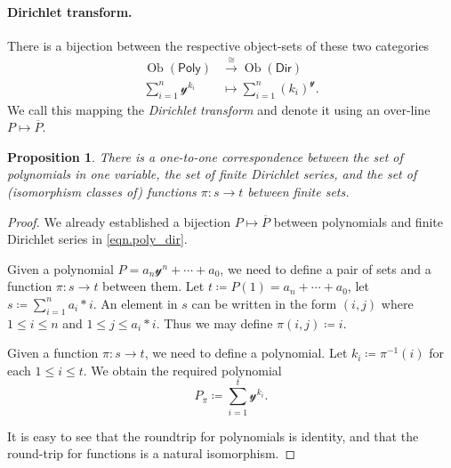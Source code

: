 \documentclass[11pt, article, one side]{memoir}
\theoremstyle{theorem}
\newtheorem{proposition}[equation]{Proposition}
\theoremstyle{definition}
\theoremstyle{remark}
\DeclareMathOperator{\ob}{Ob}
\newcommand{\Cat}[1]{\mathsf{#1}}%
\newcommand{\To}[1]{\xrightarrow{#1}}
\newcommand{\inv}{^{-1}}
\newcommand{\yon}{\mathcal{y}}
\newcommand{\poly}{\Cat{Poly}}
\newcommand{\dir}{\Cat{Dir}}
\begin{document}
\paragraph{Dirichlet transform.}
There is a bijection between the respective object-sets of these two categories
\begin{align}
\nonumber
	\ob(\poly)&\To{\cong}\ob(\dir)\\\label{eqn.poly_dir}
	\sum_{i=1}^n\yon^{k_i}&\mapsto\sum_{i=1}^n (k_i)^\yon.
\end{align}
We call this mapping the \emph{Dirichlet transform} and denote it using an over-line $P\mapsto \overline{P}$.

\begin{proposition}\label{prop.poly_function}
There is a one-to-one correspondence between the set of polynomials in one variable, the set of finite Dirichlet series, and the set of (isomorphism classes of) functions $\pi\colon s\to t$ between finite sets.
\end{proposition}
\begin{proof}
We already established a bijection $P\mapsto\overline{P}$ between polynomials and finite Dirichlet series in \cref{eqn.poly_dir}.

Given a polynomial $P=a_n\yon^n+\cdots+a_0$, we need to define a pair of sets and a function $\pi\colon s\to t$ between them. Let $t\coloneqq P(1)=a_n+\cdots+a_0$, let $s\coloneqq\sum_{i=1}^na_i*i$. An element in $s$ can be written in the form $(i,j)$ where $1\leq i\leq n$ and $1\leq j\leq a_i*i$. Thus we may define $\pi(i,j)\coloneqq i$.

Given a function $\pi\colon s\to t$, we need to define a polynomial. Let $k_i\coloneqq\pi\inv(i)$ for each $1\leq i\leq t$. We obtain the required polynomial
\begin{equation}\label{eqn.Ppi}
	P_\pi\coloneqq\sum_{i=1}^{t}\yon^{k_i}.
\end{equation}

It is easy to see that the roundtrip for polynomials is identity, and that the round-trip for functions is a natural isomorphism.
\end{proof}
\end{document}
